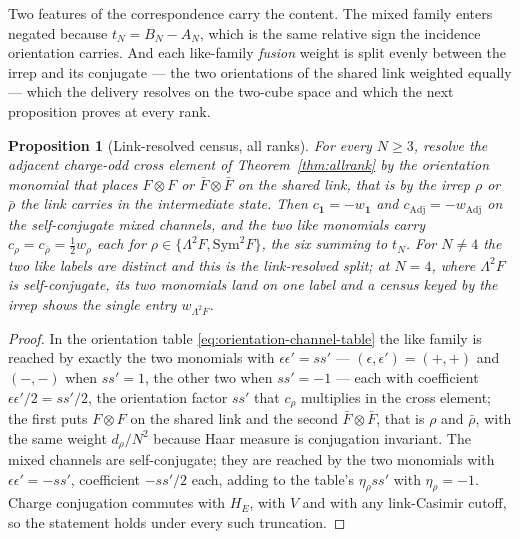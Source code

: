 \documentclass[11pt]{article}
\theoremstyle{plain}
\newtheorem{proposition}[theorem]{Proposition}
\theoremstyle{definition}
\theoremstyle{remark}
\newcommand{\chk}[1]{}
\begin{document}
Two features of the correspondence carry the content. The mixed family enters
negated because $t_N=B_N-A_N$, which is the same relative sign the incidence
orientation carries. And each like-family \emph{fusion} weight is split evenly
between the irrep and its conjugate --- the two orientations of the shared link
weighted equally --- which the delivery resolves on the two-cube space and
which the next proposition proves at every rank.

\begin{proposition}[Link-resolved census, all ranks]\label{prop:split}
For every $N\ge3$, resolve the adjacent charge-odd cross element of
Theorem~\ref{thm:allrank} by the orientation monomial that places
$F\otimes F$ or $\bar F\otimes\bar F$ on the shared link, that is by the irrep
$\rho$ or $\bar\rho$ the link carries in the intermediate state. Then
$c_{\mathbf1}=-w_{\mathbf1}$ and $c_{\mathrm{Adj}}=-w_{\mathrm{Adj}}$ on the
self-conjugate mixed channels, and the two like monomials carry
$c_\rho=c_{\bar\rho}=\tfrac12w_\rho$ each for
$\rho\in\{\Lambda^2F,\mathrm{Sym}^2F\}$, the six summing to $t_N$. For $N\ne4$
the two like labels are distinct and this is the link-resolved split; at
$N=4$, where $\Lambda^2F$ is self-conjugate, its two monomials land on one
label and a census keyed by the irrep shows the single entry
$w_{\Lambda^2F}$.
\end{proposition}

\begin{proof}
In the orientation table \eqref{eq:orientation-channel-table} the like family
is reached by exactly the two monomials with $\epsilon\epsilon'=ss'$ ---
$(\epsilon,\epsilon')=(+,+)$ and $(-,-)$ when $ss'=1$, the other two when
$ss'=-1$ --- each with coefficient $\epsilon\epsilon'/2=ss'/2$, the
orientation factor $ss'$ that $c_\rho$ multiplies in the cross element; the
first puts $F\otimes F$ on the shared link and the second
$\bar F\otimes\bar F$, that is $\rho$ and $\bar\rho$, with the same weight
$d_\rho/N^2$ because Haar measure is conjugation invariant. The mixed
channels are self-conjugate; they are reached by the two monomials with
$\epsilon\epsilon'=-ss'$, coefficient $-ss'/2$ each, adding to the table's
$\eta_\rho ss'$ with $\eta_\rho=-1$. Charge conjugation commutes with $H_E$, with $V$ and with any
link-Casimir cutoff, so the statement holds under every such truncation.
\end{proof}
\chk{the link-resolved census split is a theorem at every rank: -w\_rho on the self-conjugate mixed channels, w\_rho/2 on each like channel and its conjugate}
\end{document}
